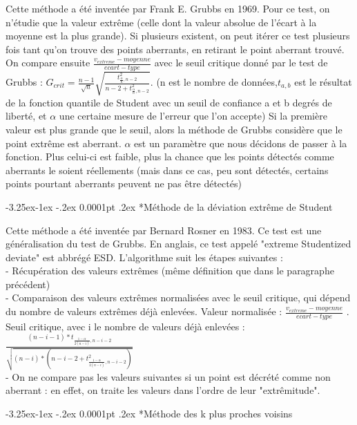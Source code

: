 \documentclass[a4paper,12pt]{article} %
\makeatletter
\renewcommand\subparagraph{\@startsection{subparagraph}{5}{\z@}%
                                      {-3.25ex\@plus -1ex \@minus -.2ex}%
                                      {0.0001pt \@plus .2ex}%
                                      {\normalfont\normalsize\bfseries}}
\makeatother
\begin{document}
                        Cette méthode a été inventée par Frank E. Grubbs en 1969. Pour ce test, on n’étudie que la valeur extrême (celle dont la valeur absolue de l’écart à la moyenne est la plus grande). Si plusieurs existent, on peut itérer ce test plusieurs fois tant qu’on trouve des points aberrants, en retirant le point aberrant trouvé. On compare ensuite $\frac{v_{extreme}-moyenne}{ecart-type}$ avec le seuil critique donné par le test de Grubbs : $G_{crit} = \frac{n-1}{\sqrt{n}}\sqrt{\frac{t^2_{\frac{\alpha}{n},n-2}}{n-2+t^2_{\frac{\alpha}{n},n-2}}}$. (n est le nombre de données,$t_{a,b}$ est le résultat de la fonction quantile de Student avec un seuil de conﬁance a et b degrés de liberté, et $\alpha$ une certaine mesure de l’erreur que l’on accepte) Si la première valeur est plus grande que le seuil, alors la méthode de Grubbs considère que le point extrême est aberrant. $\alpha$ est un paramètre que nous décidons de passer à la fonction. Plus celui-ci est faible, plus la chance que les points détectés comme aberrants le soient réellements (mais dans ce cas, peu sont détectés, certains points pourtant aberrants peuvent ne pas être détectés)


					\subparagraph*{Méthode de la déviation extrême de Student}
					
                        Cette méthode a été inventée par Bernard Rosner en 1983. Ce test est une généralisation du test de Grubbs. En anglais, ce test appelé "extreme Studentized deviate" est abbrégé ESD. L’algorithme suit les étapes suivantes : \\
                        - Récupération des valeurs extrêmes (même déﬁnition que dans le paragraphe précédent)\\
                        - Comparaison des valeurs extrêmes normalisées avec le seuil critique, qui dépend du nombre de valeurs extrêmes déjà enlevées. Valeur normalisée : $\frac{v_{extreme}-moyenne}{ecart-type}$ . Seuil critique, avec i le nombre de valeurs déjà enlevées : 
                        $\frac{    (n-i-1)*t _{     \frac{1-\alpha}{2(n-i)},n-i-2     }       }  {        \sqrt{       (n-i)*(n-i-2+t^2_{   \frac{1-\alpha}{2(n-i)},n-i-2} )      }     }  $ \\
                         - On ne compare pas les valeurs suivantes si un point est décrété comme non aberrant : en eﬀet, on traite les valeurs dans l’ordre de leur "extrêmitude".

				
					\subparagraph*{Méthode des k plus proches voisins}
					
\end{document}

